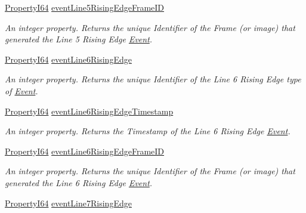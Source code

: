 \begin{DoxyCompactItemize}
\hyperlink{group___common_interface_ga81749b2696755513663492664a18a893}{Property\+I64} \hyperlink{classmv_i_m_p_a_c_t_1_1acquire_1_1_gen_i_cam_1_1_event_control_a3248150efcf40afe45c1f0c171f0d738}{event\+Line5\+Rising\+Edge\+Frame\+I\+D}
\begin{DoxyCompactList}\small\item\em An integer property. Returns the unique Identifier of the Frame (or image) that generated the Line 5 Rising Edge \hyperlink{classmv_i_m_p_a_c_t_1_1acquire_1_1_event}{Event}. \end{DoxyCompactList}\item 
\hyperlink{group___common_interface_ga81749b2696755513663492664a18a893}{Property\+I64} \hyperlink{classmv_i_m_p_a_c_t_1_1acquire_1_1_gen_i_cam_1_1_event_control_ad309edbdca41d97cd6b28258d1d78c47}{event\+Line6\+Rising\+Edge}
\begin{DoxyCompactList}\small\item\em An integer property. Returns the unique Identifier of the Line 6 Rising Edge type of \hyperlink{classmv_i_m_p_a_c_t_1_1acquire_1_1_event}{Event}. \end{DoxyCompactList}\item 
\hyperlink{group___common_interface_ga81749b2696755513663492664a18a893}{Property\+I64} \hyperlink{classmv_i_m_p_a_c_t_1_1acquire_1_1_gen_i_cam_1_1_event_control_a4e8f70d461b26b6cdc6d0319eebf1d14}{event\+Line6\+Rising\+Edge\+Timestamp}
\begin{DoxyCompactList}\small\item\em An integer property. Returns the Timestamp of the Line 6 Rising Edge \hyperlink{classmv_i_m_p_a_c_t_1_1acquire_1_1_event}{Event}. \end{DoxyCompactList}\item 
\hyperlink{group___common_interface_ga81749b2696755513663492664a18a893}{Property\+I64} \hyperlink{classmv_i_m_p_a_c_t_1_1acquire_1_1_gen_i_cam_1_1_event_control_a3460bfb68321a164f5aac51fd6690fc6}{event\+Line6\+Rising\+Edge\+Frame\+I\+D}
\begin{DoxyCompactList}\small\item\em An integer property. Returns the unique Identifier of the Frame (or image) that generated the Line 6 Rising Edge \hyperlink{classmv_i_m_p_a_c_t_1_1acquire_1_1_event}{Event}. \end{DoxyCompactList}\item 
\hyperlink{group___common_interface_ga81749b2696755513663492664a18a893}{Property\+I64} \hyperlink{classmv_i_m_p_a_c_t_1_1acquire_1_1_gen_i_cam_1_1_event_control_a8a3b9194d922016b7da093ee60b1b1b7}{event\+Line7\+Rising\+Edge}

\end{DoxyCompactItemize}
